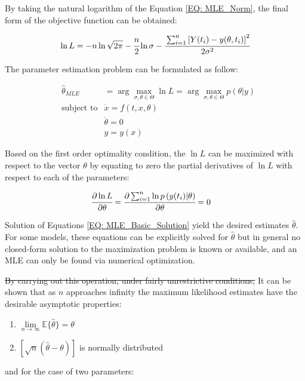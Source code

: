 \documentclass[../Article_Model_Parameters.tex]{subfiles}
\begin{document}
		By taking the natural logarithm of the Equation \ref{EQ: MLE_Norm}, the final form of the objective function can be obtained:
		
		{\footnotesize
			\begin{equation}
				\ln L = -n \ln \sqrt{2 \pi} - \cfrac{n}{2} \ln \sigma
				- \cfrac{ \sum_{i=1}^{n} \left[  Y(t_i) - y(\theta , t_i) \right]^2 }{2 \sigma^2}
			\end{equation}
		}
		
		The parameter estimation problem can be formulated as follow:
		
		{\footnotesize
			\begin{equation}
				\begin{aligned}
					&\hat{\theta}_{MLE} &= \arg \max_{\sigma, \theta \in \Theta} \ln L = \arg \max_{\sigma,\theta \in \Theta} p(\theta|y) \\
					&\text{subject to}
					& \dot{x} = f(t,x,\theta) \\
					&& \dot{\theta} = 0 \\
					&& y = y(x)
				\end{aligned}
		\end{equation} }
		
		{\color{red}Based on the first order optimality condition,} the $\ln L$ can be maximized with respect to the vector $\theta$ by equating to zero the partial derivatives of $\ln L$ with respect to each of the parameters:
		
		{\footnotesize
			\begin{align}\label{EQ: MLE_Basic_Solution}
				\cfrac{\partial \ln L}{\partial \theta} &= \cfrac{\partial \sum_{i=1}^{n} \ln p\left( y(t_i) | \theta \right) }{\partial \theta} = 0 
		\end{align} }
		
		Solution of Equations \ref{EQ: MLE_Basic_Solution} yield the desired estimates $\hat{\theta}$. For some models, these equations can be explicitly solved for $\hat{\theta}$ but in general no closed-form solution to the maximization problem is known or available, and an MLE can only be found via numerical optimization.
		
		\sout{By carrying out this operation, under fairly unrestrictive conditions,} 
		It can be shown that as $n$ approaches infinity the maximum likelihood estimates have the desirable asymptotic properties:
		
		\begin{enumerate}[label=(\arabic*)]
			\item {\footnotesize $\lim\limits_{n \rightarrow \infty} \mathbb{E}\{\hat{\theta}\} = \theta$ }
			\item {\footnotesize $\left[ \sqrt{n}\left( \hat{\theta} - \theta \right) \right]$ } is normally distributed
		\end{enumerate}
		and for the case of two parameters:
		
\end{document}
